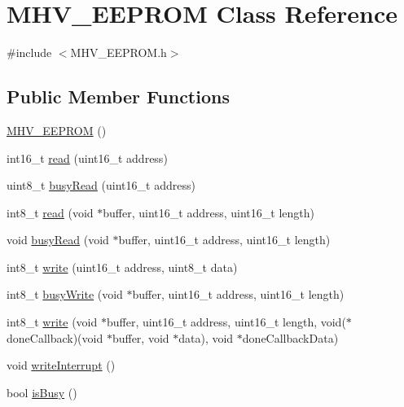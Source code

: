 \hypertarget{class_m_h_v___e_e_p_r_o_m}{
\section{\-M\-H\-V\-\_\-\-E\-E\-P\-R\-O\-M \-Class \-Reference}
\label{class_m_h_v___e_e_p_r_o_m}
}


{\ttfamily \#include $<$\-M\-H\-V\-\_\-\-E\-E\-P\-R\-O\-M.\-h$>$}

\subsection*{\-Public \-Member \-Functions}
\begin{DoxyCompactItemize}
\item 
\hyperlink{class_m_h_v___e_e_p_r_o_m_acaeffffc48a4a81e5e600fc110759cae}{\-M\-H\-V\-\_\-\-E\-E\-P\-R\-O\-M} ()
\item 
int16\-\_\-t \hyperlink{class_m_h_v___e_e_p_r_o_m_a24c6913bd28975120511526f32421ed0}{read} (uint16\-\_\-t address)
\item 
uint8\-\_\-t \hyperlink{class_m_h_v___e_e_p_r_o_m_a87d05081ca4652b2c36b76ee366eeda2}{busy\-Read} (uint16\-\_\-t address)
\item 
int8\-\_\-t \hyperlink{class_m_h_v___e_e_p_r_o_m_a5399a22382e3211edcc6466a4677a28a}{read} (void $\ast$buffer, uint16\-\_\-t address, uint16\-\_\-t length)
\item 
void \hyperlink{class_m_h_v___e_e_p_r_o_m_a76f3d0b2b2b050395c5af6daa664fd52}{busy\-Read} (void $\ast$buffer, uint16\-\_\-t address, uint16\-\_\-t length)
\item 
int8\-\_\-t \hyperlink{class_m_h_v___e_e_p_r_o_m_a8c0534fe37b0ef07b02b2cd794cc7dc0}{write} (uint16\-\_\-t address, uint8\-\_\-t data)
\item 
int8\-\_\-t \hyperlink{class_m_h_v___e_e_p_r_o_m_a4e17c3d62c5f6c4759e32f2217c68c21}{busy\-Write} (void $\ast$buffer, uint16\-\_\-t address, uint16\-\_\-t length)
\item 
int8\-\_\-t \hyperlink{class_m_h_v___e_e_p_r_o_m_a64746e9c76c7f8d20fa4d7e09d183a0d}{write} (void $\ast$buffer, uint16\-\_\-t address, uint16\-\_\-t length, void($\ast$done\-Callback)(void $\ast$buffer, void $\ast$data), void $\ast$done\-Callback\-Data)
\item 
void \hyperlink{class_m_h_v___e_e_p_r_o_m_a9772d021dd90d557318244f3353c1ba9}{write\-Interrupt} ()
\item 
bool \hyperlink{class_m_h_v___e_e_p_r_o_m_ae22d6ae1d73cd1bc21720ca6617374af}{is\-Busy} ()
\end{DoxyCompactItemize}


